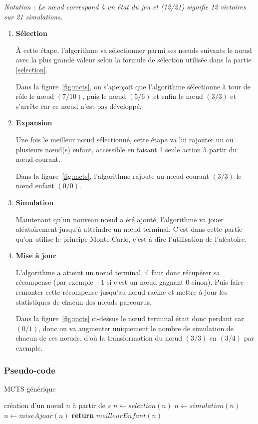 \documentclass[pdftex,french, english]{article}	%
\begin{document}
\textit{Notation : Le nœud correspond à un état du jeu et (12/21) signifie 12 victoires sur 21 simulations.} 
	\begin{enumerate}
		\item \textbf{Sélection}

		À cette étape, l'algorithme va sélectionner parmi ses nœuds suivants le nœud avec la plus grande valeur selon la formule de sélection utilisée dans la partie \ref{selection}. 

		Dans la figure~\ref{fig:mcts}, on s'aperçoit que l'algorithme sélectionne à tour de rôle le nœud $(7/10)$, puis le nœud $(5/6)$ et enfin le nœud $(3/3)$ et s'arrête car ce nœud n'est pas développé.
		\item \textbf{Expansion}

		Une fois le meilleur nœud sélectionné, cette étape va lui rajouter un ou plusieurs nœud(s) enfant, accessible en faisant 1 seule action à partir du nœud courant. 

		Dans la figure~\ref{fig:mcts}, l'algorithme rajoute au nœud courant $(3/3)$ le nœud enfant $(0/0)$.
		\item \textbf{Simulation}

		Maintenant qu'un nouveau nœud a été ajouté, l'algorithme va jouer aléatoirement jusqu'à atteindre un nœud terminal.
		C'est dans cette partie qu'on utilise le principe Monte Carlo, c'est-à-dire l'utilisation de l'aléatoire.
		\item \textbf{Mise à jour} 

		L'algorithme a atteint un nœud terminal, il faut donc récupérer sa récompense (par exemple +1 si c'est un nœud gagnant 0 sinon). Puis faire remonter cette récompense jusqu'au nœud racine et mettre à jour les statistiques de chacun des nœuds parcourus. 

		Dans la figure~\ref{fig:mcts} ci-dessus le nœud terminal était donc perdant car $(0/1)$, donc on va augmenter uniquement le nombre de simulation de chacun de ces nœuds, d'où la transformation du nœud $(3/3)$ en $(3/4)$ par exemple.
	\end{enumerate}
	\subsubsection{Pseudo-code}
	\begin{algorithm}
	\caption{MCTS générique}
	  \label{alg:mcts}
	\begin{algorithmic}[1]
	\State création d'un nœud $n$ à partir de $s$
			\State $n \gets selection(n)$ 
			\State $n \gets simulation(n)$
			\State $n \gets miseAjour(n)$
		\EndWhile
	\State \textbf{return} $meilleurEnfant(n)$
	\EndFunction
	\end{algorithmic}
	\end{algorithm}
    
\end{document}
